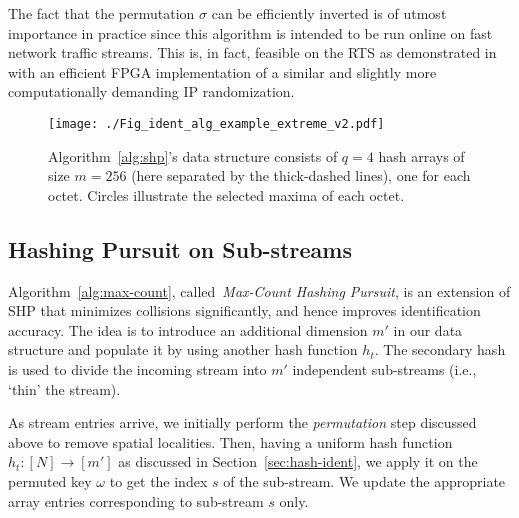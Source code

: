 \documentclass[10pt, conference, letterpaper,onecolumn]{IEEEtranv1.8}
\theoremstyle{plain}\newtheorem{thm}{Theorem}\newtheorem{lem}{Lemma}
\theoremstyle{definition}
\begin{document}
The fact that the permutation $\sigma$ can be efficiently inverted is of utmost importance in practice 
since this algorithm is intended to be run online on fast network traffic streams. This is, in fact, feasible on the RTS
as demonstrated in~\cite{4146856} with an efficient FPGA implementation of a similar and slightly more 
computationally demanding IP randomization.

 
 


\begin{figure}
        \centering
        \texttt{[image: ./Fig\_ident\_alg\_example\_extreme\_v2.pdf]}
        \caption{Algorithm~\ref{alg:shp}'s data structure consists of $q=4$ hash arrays of size $m=256$ (here separated by the thick-dashed lines), one for each octet. Circles illustrate the selected maxima of each octet.}
        \label{fig:ident_typical}
\end{figure}

\subsection{Hashing Pursuit on Sub-streams}
\label{sec:max_count}

Algorithm~\ref{alg:max-count}, called~\emph{Max-Count Hashing Pursuit}, is an extension of SHP that minimizes collisions significantly, 
and hence improves identification accuracy. The idea is to introduce an
additional dimension $m'$ in our data structure and populate it by using another hash function $h_t$. The secondary
hash is used to divide the incoming stream into $m'$ independent sub-streams (i.e., `thin' the stream). 

As stream entries arrive, we initially perform the \emph{permutation}
step discussed above to remove spatial localities.
Then, having a uniform hash function
$h_t: [N] \to [m']$ as discussed in Section~\ref{sec:hash-ident},
we apply it on the permuted key $\omega$ to get the index $s$ of the sub-stream.
We update the appropriate array entries corresponding to sub-stream $s$ only.
\end{document}

